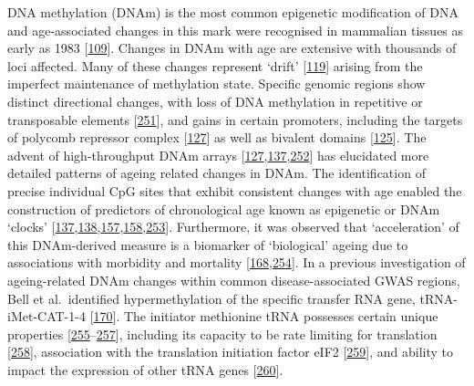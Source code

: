 \documentclass[
]{book}
\begin{document}
DNA methylation (DNAm) is the most common epigenetic modification of DNA and age-associated changes in this mark were recognised in mammalian tissues as early as 1983 {[}\protect\hyperlink{ref-Wilson1983}{109}{]}.
Changes in DNAm with age are extensive with thousands of loci affected.
Many of these changes represent `drift' {[}\protect\hyperlink{ref-Fraga2005}{119}{]} arising from the imperfect maintenance of methylation state.
Specific genomic regions show distinct directional changes, with loss of DNA methylation in repetitive or transposable elements {[}\protect\hyperlink{ref-Chuong2017}{251}{]}, and gains in certain promoters, including the targets of polycomb repressor complex {[}\protect\hyperlink{ref-Teschendorff2010}{127}{]} as well as bivalent domains {[}\protect\hyperlink{ref-Rakyan2010}{125}{]}.
The advent of high-throughput DNAm arrays {[}\protect\hyperlink{ref-Teschendorff2010}{127},\protect\hyperlink{ref-Hannum2013}{137},\protect\hyperlink{ref-Sandoval2011}{252}{]} has elucidated more detailed patterns of ageing related changes in DNAm.
The identification of precise individual CpG sites that exhibit consistent changes with age enabled the construction of predictors of chronological age known as epigenetic or DNAm `clocks' {[}\protect\hyperlink{ref-Hannum2013}{137},\protect\hyperlink{ref-Horvath2013}{138},\protect\hyperlink{ref-Levine2018}{157},\protect\hyperlink{ref-Lu2019}{158},\protect\hyperlink{ref-Horvath2018a}{253}{]}.
Furthermore, it was observed that `acceleration' of this DNAm-derived measure is a biomarker of `biological' ageing due to associations with morbidity and mortality {[}\protect\hyperlink{ref-Horvath2018}{168},\protect\hyperlink{ref-Field2018}{254}{]}.
In a previous investigation of ageing-related DNAm changes within common disease-associated GWAS regions, Bell et al.~identified hypermethylation of the specific transfer RNA gene, tRNA-iMet-CAT-1-4 {[}\protect\hyperlink{ref-Bell2016}{170}{]}.
The initiator methionine tRNA possesses certain unique properties {[}\protect\hyperlink{ref-Bhattacharyya2016}{255}--\protect\hyperlink{ref-Birch2016}{257}{]}, including its capacity to be rate limiting for translation {[}\protect\hyperlink{ref-Rideout2012}{258}{]}, association with the translation initiation factor eIF2 {[}\protect\hyperlink{ref-Kolitz2010}{259}{]}, and ability to impact the expression of other tRNA genes {[}\protect\hyperlink{ref-Pavon-Eternod2013}{260}{]}.
\end{document}
